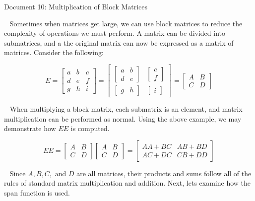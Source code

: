 \documentclass[11pt]{article}
\begin{document}
\begin{center}
Document 10: Multiplication of Block Matrices
\end{center}

\setlength{\leftskip}{0 in}
$\,\,\,$ Sometimes when matrices get large, we can use block matrices to reduce the complexity of operations we must perform. A matrix can be divided into submatrices, and a the original matrix can now be expressed as a matrix of matrices. Consider the following:

$$E=\begin{bmatrix}
a & b & c\\d & e & f\\g & h & i
\end{bmatrix}=\begin{bmatrix}
\begin{bmatrix}
a & b\\d & e
\end{bmatrix} &
\begin{bmatrix}
c\\f
\end{bmatrix}\\
\begin{bmatrix}
g & h
\end{bmatrix} &
\begin{bmatrix}
i
\end{bmatrix}
\end{bmatrix}=\begin{bmatrix}
A & B\\C & D
\end{bmatrix}
$$

$\,\,\,$ When multiplying a block matrix, each submatrix is an element, and matrix multiplication can be performed as normal. Using the above example, we may demonstrate how $EE$ is computed.

$$
EE=\begin{bmatrix}
A & B\\C & D
\end{bmatrix}\begin{bmatrix}
A & B\\C & D
\end{bmatrix}=
\begin{bmatrix}
AA+BC & AB+BD\\AC+DC & CB+DD
\end{bmatrix}
$$

$\,\,\,$ Since $A,B,C,\text{ and }D$ are all matrices, their products and sums follow all of the rules of standard matrix multiplication and addition. Next, lets examine how the span function is used.
\end{document}
